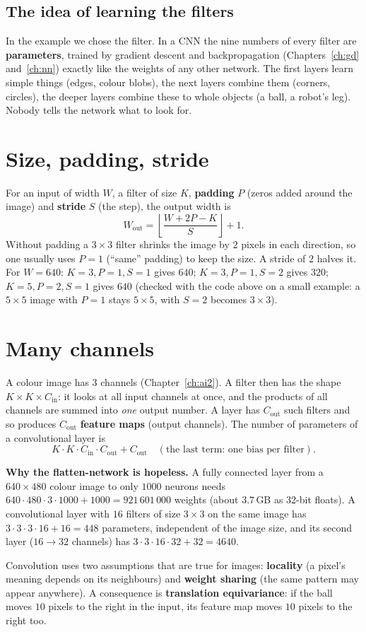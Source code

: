 \subsection*{The idea of learning the filters}
In the example we chose the filter. In a CNN the nine numbers of every filter are \textbf{parameters}, trained by gradient descent and backpropagation (Chapters~\ref{ch:gd} and~\ref{ch:nn}) exactly like the weights of any other network. The first layers learn simple things (edges, colour blobs), the next layers combine them (corners, circles), the deeper layers combine these to whole objects (a ball, a robot's leg). Nobody tells the network what to look for.

\section*{Size, padding, stride}
For an input of width $W$, a filter of size $K$, \textbf{padding} $P$ (zeros added around the image) and \textbf{stride} $S$ (the step), the output width is
\[
W_\text{out}=\left\lfloor\frac{W+2P-K}{S}\right\rfloor+1.
\]
Without padding a $3\times3$ filter shrinks the image by $2$ pixels in each direction, so one usually uses $P=1$ (``same'' padding) to keep the size. A stride of $2$ halves it. For $W=640$: $K=3,P=1,S=1$ gives $640$; $K=3,P=1,S=2$ gives $320$; $K=5,P=2,S=1$ gives $640$ (checked with the code above on a small example: a $5\times5$ image with $P=1$ stays $5\times5$, with $S=2$ becomes $3\times3$).

\section*{Many channels}
A colour image has $3$ channels (Chapter~\ref{ch:ai2}). A filter then has the shape $K\times K\times C_\text{in}$: it looks at all input channels at once, and the products of all channels are summed into \emph{one} output number. A layer has $C_\text{out}$ such filters and so produces $C_\text{out}$ \textbf{feature maps} (output channels). The number of parameters of a convolutional layer is
\[
K\cdot K\cdot C_\text{in}\cdot C_\text{out}+C_\text{out}\quad(\text{the last term: one bias per filter}).
\]
\begin{example}
\textbf{Why the flatten-network is hopeless.} A fully connected layer from a $640\times480$ colour image to only $1000$ neurons needs $640\cdot480\cdot3\cdot1000+1000=921\,601\,000$ weights (about $3.7$\,GB as 32-bit floats). A convolutional layer with $16$ filters of size $3\times3$ on the same image has $3\cdot3\cdot3\cdot16+16=448$ parameters, independent of the image size, and its second layer ($16\to32$ channels) has $3\cdot3\cdot16\cdot32+32=4640$.
\end{example}
Convolution uses two assumptions that are true for images: \textbf{locality} (a pixel's meaning depends on its neighbours) and \textbf{weight sharing} (the same pattern may appear anywhere). A consequence is \textbf{translation equivariance}: if the ball moves $10$ pixels to the right in the input, its feature map moves $10$ pixels to the right too.

